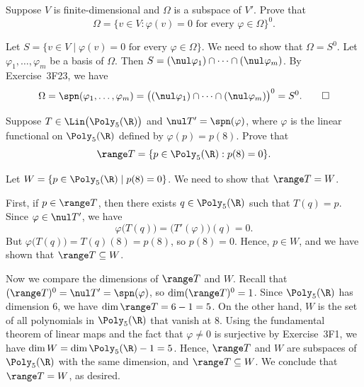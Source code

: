 \begin{exc}
\begin{exercise}
Suppose $V$ is finite-dimensional and $\Omega$ is a subspace of $V'$. Prove that
\[ \Omega = \{v\in V : \varphi(v)=0 \text{ for every } \varphi\in\Omega\}^0. \]
\end{exercise}
\begin{solution}

Let $S=\{v\in V \mid \varphi(v)=0 \text{ for every } \varphi\in\Omega\}$. We
need to show that $\Omega=S^0$. Let $\varphi_1,\dots,\varphi_m$ be a basis of
$\Omega$. Then $S=(\nul\varphi_1)\cap\cdots\cap(\nul\varphi_m)$. By
Exercise~3F23, we have
\[ \Omega = \spn(\varphi_1,\dots,\varphi_m)
   = \bigl((\nul\varphi_1)\cap\cdots\cap(\nul\varphi_m)\bigr)^0 = S^0.
   \qedhere \]
\end{solution}

\begin{exercise}
Suppose $T\in\Lin\bigl(\Poly_5(\R)\bigr)$ and $\nul T'=\spn(\varphi)$, where
$\varphi$ is the linear functional on $\Poly_5(\R)$ defined by
$\varphi(p)=p(8)$. Prove that
\[ \range T = \{p\in\Poly_5(\R) : p(8)=0\}. \]
\end{exercise}
\begin{solution}
Let $W=\{p\in\Poly_5(\R) \mid p(8)=0\}$. We need to show that $\range T=W$.

First, if $p\in\range T$, then there exists $q\in\Poly_5(\R)$ such that
$T(q)=p$. Since $\varphi\in\nul T'$, we have
\[ \varphi\bigl(T(q)\bigr) = \bigl(T'(\varphi)\bigr)(q) = 0. \]
But $\varphi\bigl(T(q)\bigr)=T(q)(8)=p(8)$, so $p(8)=0$. Hence, $p\in W$, and
we have shown that $\range T\subseteq W$.

Now we compare the dimensions of $\range T$ and $W$. Recall that
$(\range T)^0=\nul T'=\spn(\varphi)$, so $\dim(\range T)^0=1$. Since
$\Poly_5(\R)$ has dimension $6$, we have $\dim\range T=6-1=5$. On the other
hand, $W$ is the set of all polynomials in $\Poly_5(\R)$ that vanish at $8$.
Using the fundamental theorem of linear maps and the fact that $\varphi\ne0$ is
surjective by Exercise~3F1, we have $\dim W=\dim\Poly_5(\R)-1=5$. Hence,
$\range T$ and $W$ are subspaces of $\Poly_5(\R)$ with the same dimension, and
$\range T\subseteq W$. We conclude that $\range T=W$, as desired.
\end{solution}


\end{exc}
